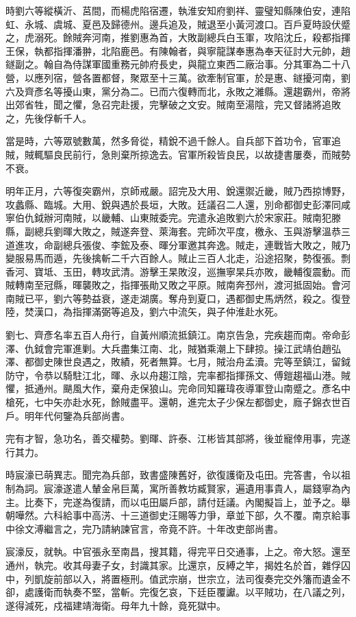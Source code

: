 \begin{pinyinscope}
時劉六等縱橫沂、莒間，而楊虎陷宿遷，執淮安知府劉祥、靈璧知縣陳伯安，連陷虹、永城、虞城、夏邑及歸德州。邊兵追及，賊退至小黃河渡口。百戶夏時設伏蹙之，虎溺死。餘賊奔河南，推劉惠為首，大敗副總兵白玉軍，攻陷沈丘，殺都指揮王保，執都指揮潘翀，北陷鹿邑。有陳翰者，與寧龍謀奉惠為奉天征討大元帥，趙鐩副之。翰自為侍謀軍國重務元帥府長史，與龍立東西二廠治事。分其軍為二十八營，以應列宿，營各置都督，聚眾至十三萬。欲牽制官軍，於是惠、鐩擾河南，劉六及齊彥名等擾山東，黨分為二。已而六復轉而北，永敗之濰縣。還趨霸州，帝將出郊省牲，聞之懼，急召完赴援，完擊破之文安。賊南至湯陰，完又督諸將追敗之，先後俘斬千人。

當是時，六等眾號數萬，然多脅從，精銳不過千餘人。自兵部下首功令，官軍追賊，賊輒驅良民前行，急則棄所掠逸去。官軍所殺皆良民，以故捷書屢奏，而賊勢不衰。

明年正月，六等復突霸州，京師戒嚴。詔完及大用、銳還禦近畿，賊乃西掠博野，攻蠡縣、臨城。大用、銳與遇於長垣，大敗。廷議召二人還，別命都御史彭澤同咸寧伯仇鉞辦河南賊，以畿輔、山東賊委完。完遣永追敗劉六於宋家莊。賊南犯滕縣，副總兵劉暉大敗之，賊遂奔登、萊海套。完師次平度，檄永、玉與游擊溫恭三道進攻，命副總兵張俊、李鋐及泰、暉分軍邀其奔逸。賊走，連戰皆大敗之，賊乃變服易馬而遁，先後擒斬二千六百餘人。賊止三百人北走，沿途招聚，勢復張。剽香河、寶坻、玉田，轉攻武清。游擊王杲敗沒，巡撫寧杲兵亦敗，畿輔復震動。而賊轉南至冠縣，暉襲敗之，指揮張勛又敗之平原。賊南奔邳州，渡河抵固始。會河南賊已平，劉六等勢益衰，遂走湖廣。奪舟到夏口，遇都御史馬炳然，殺之。復登陸，焚漢口，為指揮滿弼等追及，劉六中流矢，與子仲淮赴水死。

劉七、齊彥名率五百人舟行，自黃州順流抵鎮江。南京告急，完疾趨而南。帝命彭澤、仇鉞會完軍進剿。大兵盡集江南、北，賊猶乘潮上下肆掠。操江武靖伯趙弘澤、都御史陳世良遇之，敗績，死者無算。七月，賊治舟孟瀆。完等至鎮江，留鉞防守，令恭以騎駐江北，暉、永以舟趨江陰，完率都指揮孫文、傅鎧趨福山港。賊懼，抵通州。颶風大作，棄舟走保狼山。完命同知羅瑋夜導軍登山南蹙之。彥名中槍死，七中矢亦赴水死，餘賊盡平。還朝，進完太子少保左都御史，廕子錦衣世百戶。明年代何鑒為兵部尚書。

完有才智，急功名，善交權勢。劉暉、許泰、江彬皆其部將，後並寵倖用事，完遂行其力。

時宸濠已萌異志。聞完為兵部，致書盛陳舊好，欲復護衛及屯田。完答書，令以祖制為詞。宸濠遂遣人輦金帛巨萬，寓所善教坊臧賢家，遍遺用事貴人，屬錢寧為內主。比奏下，完遂為復請，而以屯田屬戶部，請付廷議。內閣擬旨上，並予之。舉朝嘩然。六科給事中高淓、十三道御史汪賜等力爭，章並下部，久不覆。南京給事中徐文溥繼言之，完乃請納諫官言，帝竟不許。十年改吏部尚書。

宸濠反，就執。中官張永至南昌，搜其籍，得完平日交通事，上之。帝大怒。還至通州，執完。收其母妻子女，封識其家。比還京，反縛之竿，揭姓名於首，雜俘囚中，列凱旋前部以入，將置極刑。值武宗崩，世宗立，法司復奏完交外籓而遺金不卻，處護衛而執奏不堅，當斬。完復乞哀，下廷臣覆讞。以平賊功，在八議之列，遂得減死，戍福建靖海衛。母年九十餘，竟死獄中。


\end{pinyinscope}

